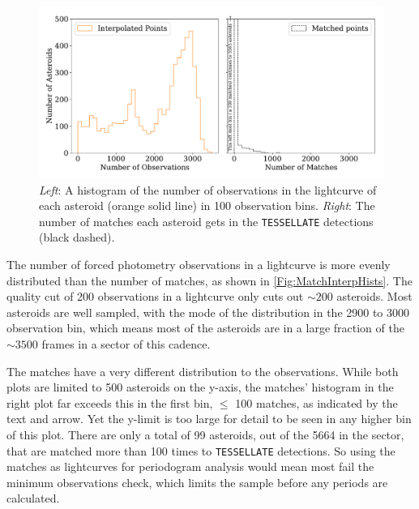 \documentclass{UCreport}
\begin{document}
\begin{figure}
  \centering
  \includegraphics[width=\textwidth]{./Figures/pointsMatchesNumberHistdoubleChangedbound.pdf}
  \caption[Observation and Match Number Distribution]{\textit{Left}: A histogram of the number of observations in the lightcurve of each asteroid (orange solid line) in 100 observation bins. \textit{Right}: The number of matches each asteroid gets in the \texttt{TESSELLATE} detections (black dashed).
  }
  \label{Fig:MatchInterpHists}
\end{figure}

The number of forced photometry observations in a lightcurve is more evenly distributed than the number of matches, as shown in \autoref{Fig:MatchInterpHists}.
The quality cut of 200 observations in a lightcurve only cuts out $\sim 200$ asteroids.
Most asteroids are well sampled, with the mode of the distribution in the 2900 to 3000 observation bin, which means most of the asteroids are in a large fraction of the  $\sim3500$ frames in a sector of this cadence.

The matches have a very different distribution to the observations.
While both plots are limited to 500 asteroids on the y-axis, the matches' histogram in the right plot far exceeds this in the first bin, $\leq$ 100 matches, as indicated by the text and arrow.
Yet the y-limit is too large for detail to be seen in any higher bin of this plot.
There are only a total of 99 asteroids, out of the 5664 in the sector, that are matched more than 100 times to \texttt{TESSELLATE} detections.
So using the matches as lightcurves for periodogram analysis would mean most fail the minimum observations check, which limits the sample before any periods are calculated.
\end{document}
